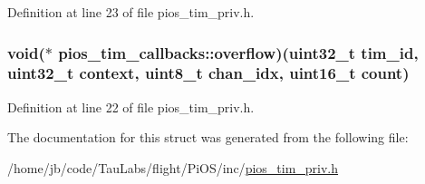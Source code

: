 \-Definition at line 23 of file pios\-\_\-tim\-\_\-priv.\-h.

\hypertarget{structpios__tim__callbacks_a7e55f8bf5b5867b790dc9bf1e929ac6f}{
\subsubsection[{overflow}]{\setlength{\rightskip}{0pt plus 5cm}void($\ast$ {\bf pios\-\_\-tim\-\_\-callbacks\-::overflow})(uint32\-\_\-t tim\-\_\-id, uint32\-\_\-t context, uint8\-\_\-t chan\-\_\-idx, uint16\-\_\-t count)}}\label{structpios__tim__callbacks_a7e55f8bf5b5867b790dc9bf1e929ac6f}


\-Definition at line 22 of file pios\-\_\-tim\-\_\-priv.\-h.



\-The documentation for this struct was generated from the following file\-:\begin{DoxyCompactItemize}
\item 
/home/jb/code/\-Tau\-Labs/flight/\-Pi\-O\-S/inc/\hyperlink{pios__tim__priv_8h}{pios\-\_\-tim\-\_\-priv.\-h}\end{DoxyCompactItemize}
